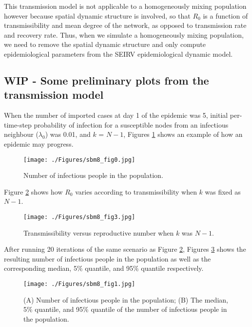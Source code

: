 \documentclass[a4paper]{article}
\begin{document}
	This transmission model is not applicable to a homogeneously mixing population however because spatial dynamic structure is involved, so that $R_0$ is a function of transmissibility and mean degree of the network, as opposed to transmission rate and recovery rate. Thus, when we simulate a homogeneously mixing population, we need to remove the spatial dynamic structure and only compute epidemiological parameters from the SEIRV epidemiological dynamic model.
	
	\subsection{WIP - Some preliminary plots from the transmission model}
	When the number of imported cases at day 1 of the epidemic was 5, initial per-time-step probability of infection for a susceptible nodes from an infectious neighbour ($\lambda_0$) was 0.01, and $k$ = $N-1$, Figures \ref{fig:seirv} shows an example of how an epidemic may progress.
	\begin{figure}[!ht]
	    \begin{center}	
			\texttt{[image: ./Figures/sbm8\_fig0.jpg]} 
		\end{center}
		\caption[Number of infectious people in the population]{Number of infectious people in the population.}
		\label{fig:seirv}
	\end{figure}
		
Figure \ref{fig:transmodel3} shows how $R_0$ varies according to transmissibility when $k$ was fixed as $N-1$. 
		\begin{figure}[!ht]
		    \begin{center}	
			    \texttt{[image: ./Figures/sbm8\_fig3.jpg]} 
		    \end{center}
		    \caption[Transmissibility versus reproductive number when $k$ was  $N-1$]{Transmissibility versus reproductive number when $k$ was $N-1$.}
		    \label{fig:transmodel3}
	    \end{figure}
	    
After running 20 iterations of the same scenario as Figure \ref{fig:transmodel3}, Figures \ref{fig:transmodel1} shows the resulting number of infectious people in the population as well as the corresponding median, 5\% quantile, and 95\% quantile respectively. 	    
		\begin{figure}[!ht]
			\begin{center}	
				\texttt{[image: ./Figures/sbm8\_fig1.jpg]} 
			\end{center}
			\caption[Number of infectious people in the population]{(A) Number of infectious people in the population; (B) The median, 5\% quantile, and 95\% quantile of the number of infectious people in the population.}
			\label{fig:transmodel1}
		\end{figure}
		
\end{document}
